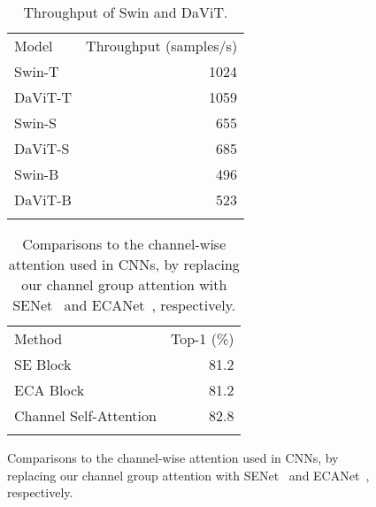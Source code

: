 \documentclass[runningheads]{llncs}
\newlength\savewidth
\newcommand\shline{\noalign{\global\savewidth\arrayrulewidth
  \global\arrayrulewidth 1pt}\hline\noalign{\global\arrayrulewidth\savewidth}}
\begin{document}
\begin{figure}[t]
\begin{minipage}{0.5\linewidth}
\begin{table}[H]
\centering
\caption{Throughput of Swin and DaViT.}
\setlength{\tabcolsep}{4pt}
\renewcommand\arraystretch{1.05}
\begin{tabular}{lr}
\shline
Model & Throughput (samples/s) \\
\shline
Swin-T  & 1024                                                             \\
DaViT-T & 1059                                                             \\ \hline
Swin-S  & 655                                                             \\
DaViT-S & 685                                                             \\ \hline
Swin-B  & 496                                                             \\
DaViT-B & 523                                                             \\ 
\shline
\end{tabular}
\label{tab:throughput}
\end{table}
\end{minipage}
\begin{minipage}{0.49\linewidth}
\begin{table}[H]
\centering
\caption{Comparisons to the channel-wise attention used in CNNs, by replacing our channel group attention with SENet~\cite{hu2018squeeze} and ECANet~\cite{wang2020eca}, respectively.}
\setlength{\tabcolsep}{4pt}
\renewcommand\arraystretch{1.1}
\begin{tabular}{lr}
\shline
Method & Top-1 (\%) \\
\shline
SE Block~\cite{hu2018squeeze}  & 81.2        \\
ECA Block~\cite{wang2020eca} & 81.2  \\ 
Channel Self-Attention &  82.8     \\ 
\shline
\end{tabular}
\label{tab:attention}
\end{table}
\end{minipage}
\end{figure}
\end{document}

